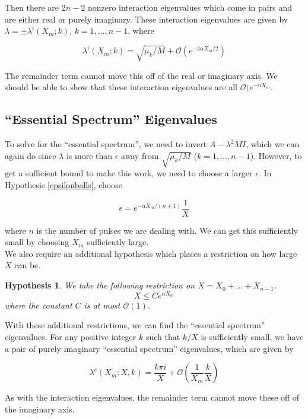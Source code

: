 \documentclass[12pt]{article}
\newtheorem{hypothesis}{Hypothesis}
\begin{document}
Then there are $2n-2$ nonzero interaction eigenvalues which come in pairs and are either real or purely imaginary. These interaction eigenvalues are given by $\lambda = \pm \lambda^i(X_m; k)$, $k = 1, \dots, n-1$, where

\begin{equation}\label{inteigs}
\lambda^i(X_m; k) = \sqrt{\mu_k / M} + \mathcal{O}(e^{-3 \alpha X_m/2})
\end{equation}

The remainder term cannot move this off of the real or imaginary axis. We should be able to show that these interaction eigenvalues are all $\mathcal{O}(e^{-\alpha X_m}$.

\subsection{``Essential Spectrum'' Eigenvalues}

To solve for the ``essential spectrum'', we need to invert $A - \lambda^2 M I$, which we can again do since $\lambda$ is more than $\epsilon$ away from $\sqrt{\mu_k/M}$ ($k = 1, \dots, n-1$). However, to get a sufficient bound to make this work, we need to choose a larger $\epsilon$. In Hypothesis \ref{epsilonballs}, choose

\[
\epsilon = e^{-\alpha X_m/(n+1)} \frac{1}{X}
\]

where $n$ is the number of pulses we are dealing with. We can get this sufficiently small by choosing $X_m$ sufficiently large.\\ 

We also require an additional hypothesis which places a restriction on how large $X$ can be.

\begin{hypothesis}\label{Xrestriction}
We take the following restriction on $X = X_0 + \dots + X_{n-1}$.
\[
X \leq C e^{\alpha X_m}
\]
where the constant $C$ is at most $\mathcal{O}(1)$.
\end{hypothesis}

With these additional restrictions, we can find the ``essential spectrum'' eigenvalues. For any positive integer $k$ such that $k/X$ is sufficiently small, we have a pair of purely imaginary ``essential spectrum'' eigenvalues, which are given by

\[
\lambda^c(X_m; X, k) = \frac{k \pi i}{X} + \mathcal{O}\left( \frac{1}{X_m} \frac{k}{X} \right)
\]

As with the interaction eigenvalues, the remainder term cannot move these off of the imaginary axis.\\
\end{document}
